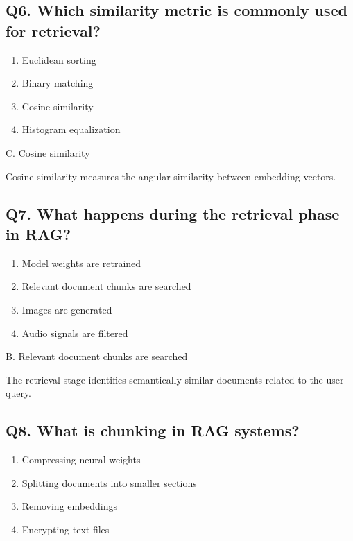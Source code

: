 \documentclass[12pt,a4paper]{article}
\begin{document}
\subsection*{Q6. Which similarity metric is commonly used for retrieval?}

\begin{enumerate}[label=\Alph*.]
\item Euclidean sorting
\item Binary matching
\item Cosine similarity
\item Histogram equalization
\end{enumerate}

\begin{tcolorbox}[colback=mid,colframe=softblue,title=Correct Answer]
C. Cosine similarity

Cosine similarity measures the angular similarity between embedding vectors.
\end{tcolorbox}


\subsection*{Q7. What happens during the retrieval phase in RAG?}

\begin{enumerate}[label=\Alph*.]
\item Model weights are retrained
\item Relevant document chunks are searched
\item Images are generated
\item Audio signals are filtered
\end{enumerate}

\begin{tcolorbox}[colback=mid,colframe=softblue,title=Correct Answer]
B. Relevant document chunks are searched

The retrieval stage identifies semantically similar documents related to the user query.
\end{tcolorbox}


\subsection*{Q8. What is chunking in RAG systems?}

\begin{enumerate}[label=\Alph*.]
\item Compressing neural weights
\item Splitting documents into smaller sections
\item Removing embeddings
\item Encrypting text files
\end{enumerate}
\end{document}
